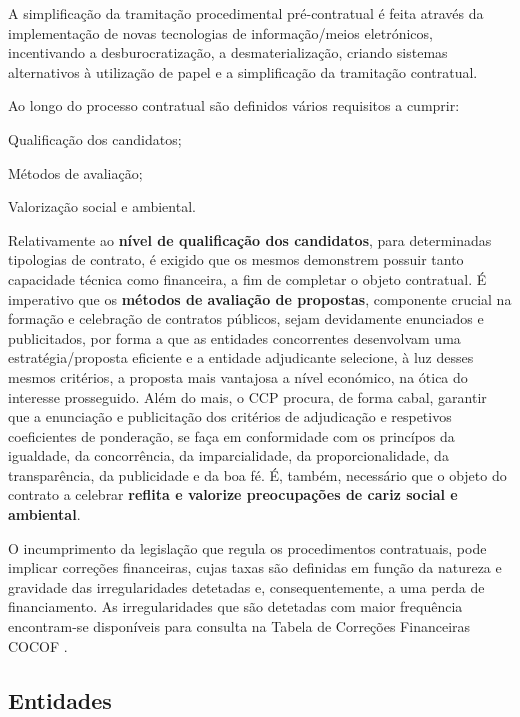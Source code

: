 A simplificação da tramitação procedimental pré-contratual é feita através da implementação de novas tecnologias de informação/meios eletrónicos, incentivando a desburocratização, a desmaterialização, criando sistemas alternativos à utilização de papel e a simplificação da tramitação contratual.


Ao longo do processo contratual são definidos vários requisitos a cumprir:

\begin{my_enumerate}
	\item Qualificação dos candidatos;
	\item Métodos de avaliação;
	\item Valorização social e ambiental.
\end{my_enumerate}

Relativamente ao \textbf{nível de qualificação dos candidatos}, para determinadas tipologias de contrato, é exigido que os mesmos demonstrem possuir tanto capacidade técnica como financeira, a fim de completar o objeto contratual. 
É imperativo que os \textbf{métodos de avaliação de propostas}, componente crucial na formação e celebração de contratos públicos, sejam devidamente enunciados e publicitados, por forma a que as entidades concorrentes desenvolvam uma estratégia/proposta eficiente e a entidade adjudicante selecione, à luz desses mesmos critérios, a proposta mais vantajosa a nível económico, na ótica do interesse prosseguido. 
Além do mais, o CCP procura, de forma cabal, garantir que a enunciação e publicitação dos critérios de adjudicação e respetivos coeficientes de ponderação, se faça em conformidade com os princípos da igualdade, da concorrência, da imparcialidade, da proporcionalidade, da transparência, da publicidade e da boa fé.
É, também, necessário que o objeto do contrato a celebrar \textbf{reflita e valorize preocupações de cariz social e ambiental}\cite{ccp}\cite{guia_poise}. 

O incumprimento da legislação  que regula os procedimentos contratuais, pode implicar correções financeiras, cujas taxas são definidas em função da natureza e gravidade das irregularidades detetadas e, consequentemente, a uma perda de financiamento. As irregularidades que são detetadas com maior frequência encontram-se disponíveis para consulta na Tabela de Correções Financeiras COCOF \cite{corrections}\cite{cocoftab}.





\subsection{Entidades}


